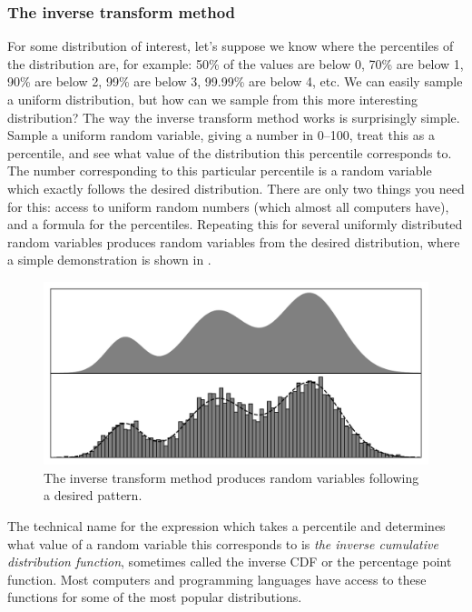 \documentclass[11pt,a4paper,twoside,english]{extarticle}
\begin{document}
\subsubsection{The inverse transform method}

For some distribution of interest, let's suppose we know where the percentiles of the distribution are, for example: 50\% of the values are below 0, 70\% are below 1, 90\% are below 2, 99\% are below 3, 99.99\% are below  4, etc. We can easily sample a uniform distribution, but how can we sample from this more interesting distribution? The way the inverse transform method works is surprisingly simple. Sample a uniform random variable, giving a number in 0--100, treat this as a percentile, and see what value of the distribution this percentile corresponds to. The number corresponding to this particular percentile is a random variable which exactly follows the desired distribution. There are only two things you need for this: access to uniform random numbers (which almost all computers have), and a formula for the percentiles. Repeating this for several uniformly distributed random variables produces random variables from the desired distribution, where a simple demonstration is shown in .

\begin{figure}[htb]
\centering
\includegraphics[width=0.7\linewidth, clip=true, trim={5mm, 2mm, 5mm, 5mm}]{inverse_cdf_transformation_method_schematic_simplified}
\caption[The inverse transform method]{The inverse transform method produces random variables following a desired pattern.}
\label{fig:inverse_cdf_transformation_method_schematic_simplified}
\end{figure}

The technical name for the expression which takes a percentile and determines what value of a random variable this corresponds to is \emph{the inverse cumulative distribution function}, sometimes called the inverse CDF or the percentage point function. Most computers and programming languages have access to these functions for some of the most popular distributions. 
\end{document}
